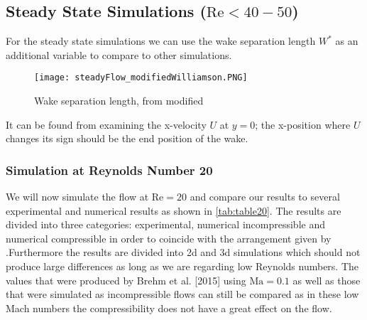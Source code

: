 	\subsection{Steady State Simulations ($\text{Re} < 40-50$)}
	For the steady state simulations we can use the wake separation length $W^*$ as an additional variable to compare to other simulations.
			\begin{figure}[htp]
				\centering
				\texttt{[image: steadyFlow\_modifiedWilliamson.PNG]}
				\caption{Wake separation length, from \cite{williamson1996vortex} modified }
				\label{fig:wakeSeparation}
			\end{figure} 
	It can be found from examining the x-velocity $U$ at $y=0$; the x-position where $U$ changes its sign should be the end position of the wake.

	
	\subsubsection{Simulation at Reynolds Number 20}
	We will now simulate the flow at $\text{Re}=20$ and compare our results to several experimental and numerical results as shown in \cref{tab:table20}. The results are divided into three categories: experimental, numerical incompressible and numerical compressible in order to coincide with the arrangement given by \cite{ayers}.Furthermore the results are divided into \gls{2d} and \gls{3d} simulations which should not produce large differences as long as we are regarding low Reynolds numbers. The values that were produced by Brehm et al. [2015] using $\text{Ma} = 0.1$ as well as those that were simulated as incompressible flows can still be compared as in these low Mach numbers the compressibility does not have a great effect on the flow.

